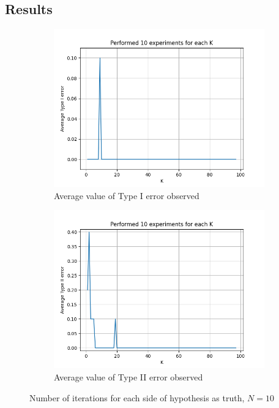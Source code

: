 \documentclass[fleqn, 11pt]{article}
\begin{document}
\subsection{Results}
\begin{figure}[H]
    \centering
    \begin{subfigure}[H]{0.49\textwidth}
        \centering
        \includegraphics[width=\textwidth]{P4/type1_10.png}
        \caption[]{Average value of Type I error observed}
    \end{subfigure}
    \begin{subfigure}[H]{0.49\textwidth}
        \centering
        \includegraphics[width=\textwidth]{P4/type2_10.png}
        \caption[]{Average value of Type II error observed}
    \end{subfigure}
    \caption{Number of iterations for each side of hypothesis as truth, $N = 10$}
\end{figure}
\end{document}

